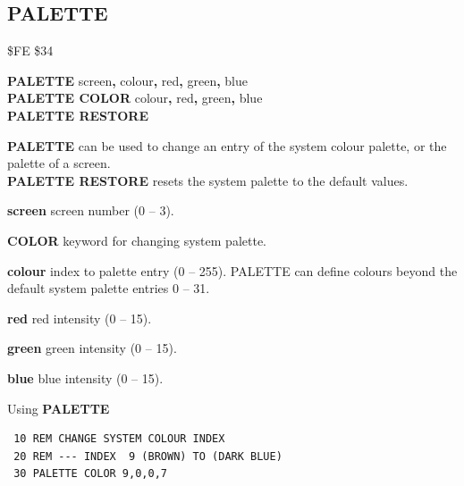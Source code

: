 
\newpage
\subsection{PALETTE}
\begin{description}[leftmargin=2cm,style=nextline]
\item [Token:] \$FE \$34
\item [Format:] {\bf PALETTE} screen{\bf,} colour{\bf,} red{\bf,} green{\bf,} blue \\
		{\bf PALETTE COLOR} colour{\bf,} red{\bf,} green{\bf,} blue \\
                {\bf PALETTE RESTORE}
\item [Usage:]  {\bf PALETTE} can be used to change an
                entry of the system colour palette, or the palette
                of a screen. \\
                {\bf PALETTE RESTORE} resets the system palette to
                the default values.

                {\bf screen} screen number (0 -- 3).

                {\bf COLOR} keyword for changing system palette.

                {\bf colour} index to palette entry (0 -- 255). PALETTE can define colours beyond the default system palette entries 0 -- 31.

                {\bf red} red intensity (0 -- 15).

                {\bf green} green intensity (0 -- 15).

                {\bf blue} blue intensity (0 -- 15).

\item [Example:] Using {\bf PALETTE}

\begin{tcolorbox}[colback=black,coltext=white]
\verbatimfont{\codefont}
\begin{verbatim}
 10 REM CHANGE SYSTEM COLOUR INDEX
 20 REM --- INDEX  9 (BROWN) TO (DARK BLUE)
 30 PALETTE COLOR 9,0,0,7
\end{verbatim}
\end{tcolorbox}


\end{description}
